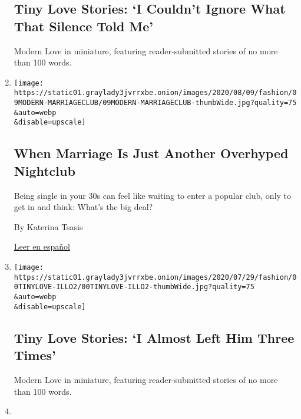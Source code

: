 \begin{enumerate}
{  \subsection{Tiny Love Stories: `I Couldn't Ignore What That Silence
  Told
  Me'}\label{tiny-love-stories-i-couldnt-ignore-what-that-silence-told-me}}

  Modern Love in miniature, featuring reader-submitted stories of no
  more than 100 words.
\item
  \href{/2020/08/07/style/modern-love-when-marriage-is-just-another-overhyped-nightclub.html}{}

  \texttt{[image: https://static01.graylady3jvrrxbe.onion/images/2020/08/09/fashion/09MODERN-MARRIAGECLUB/09MODERN-MARRIAGECLUB-thumbWide.jpg?quality=75\\\&auto=webp\\\&disable=upscale]}

  \hypertarget{when-marriage-is-just-another-overhyped-nightclub}{%
  \subsection{When Marriage Is Just Another Overhyped
  Nightclub}\label{when-marriage-is-just-another-overhyped-nightclub}}

  Being single in your 30s can feel like waiting to enter a popular
  club, only to get in and think: What's the big deal?

  By Katerina Tsasis

  \href{https://www.nytimes3xbfgragh.onion/es/2020/08/16/espanol/estilos-de-vida/soltera-amor.html}{Leer
  en español}
\item
  \href{/2020/08/04/style/tiny-modern-love-stories-coronavirus-i-almost-left-him.html}{}

  \texttt{[image: https://static01.graylady3jvrrxbe.onion/images/2020/07/29/fashion/00TINYLOVE-ILLO2/00TINYLOVE-ILLO2-thumbWide.jpg?quality=75\\\&auto=webp\\\&disable=upscale]}

  \hypertarget{tiny-love-stories-i-almost-left-him-three-times}{%
  \subsection{Tiny Love Stories: `I Almost Left Him Three
  Times'}\label{tiny-love-stories-i-almost-left-him-three-times}}

  Modern Love in miniature, featuring reader-submitted stories of no
  more than 100 words.
\item
  \href{/2020/07/31/style/modern-love-spending-tenderness-on-animals.html}{}


\end{enumerate}
